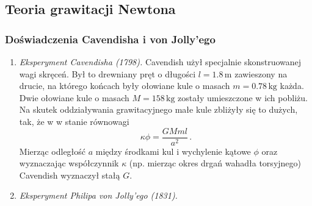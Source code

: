 \documentclass[../main.tex]{subfiles}
\begin{document}
\subsection{Teoria grawitacji Newtona}

\noindent{}
\subsubsection{Doświadczenia Cavendisha i von Jolly'ego}
\begin{enumerate}
    \item \textit{Eksperyment Cavendisha (1798).} Cavendish użył specjalnie skonstruowanej wagi skręceń. Był to drewniany pręt o długości \(l=1.8\,\text{m}\) zawieszony na drucie, na którego końcach były ołowiane kule o masach \(m=0.78\,\text{kg}\) każda. Dwie ołowiane kule o masach \(M=158\,\text{kg}\) zostały umieszczone w ich pobliżu. Na skutek oddziaływania grawitacyjnego małe kule zbliżyły się to dużych, tak, że w w stanie równowagi
    \begin{equation*}
        \kappa \phi=\frac{GMml}{a^2}\,.
    \end{equation*}
    Mierząc odległość \(a\) między środkami kul i wychylenie kątowe \(\phi\) oraz wyznaczając współczynnik \(\kappa\) (np. mierząc okres drgań wahadła torsyjnego) Cavendish wyznaczył stałą \(G\).
    
    \item \textit{Eksperyment Philipa von Jolly'ego (1831). }
\end{enumerate}
\end{document}
